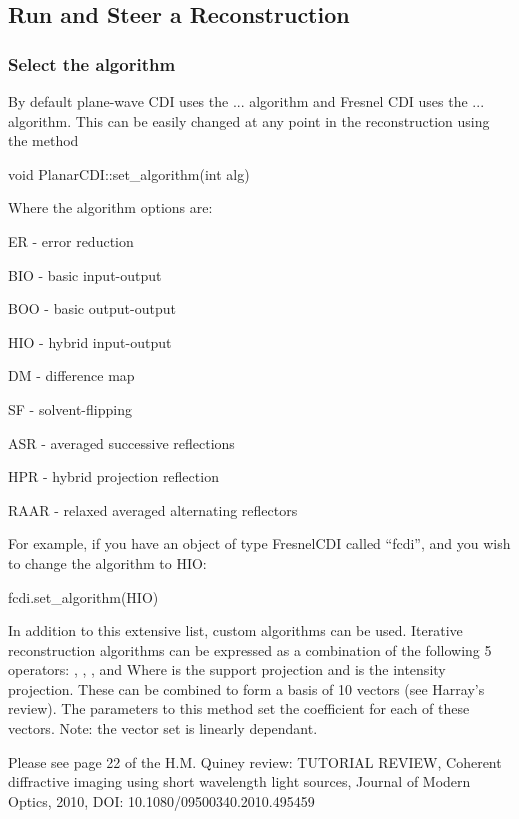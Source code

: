 \documentclass[]{cxs-software}
\begin{document}
\subsection{Run and Steer a Reconstruction}


\subsubsection{Select the algorithm}

By default plane-wave CDI uses the ... algorithm and Fresnel CDI uses
the ... algorithm. This can be easily changed at any point in the
reconstruction using the method

\begin{myverbatim}
void PlanarCDI::set_algorithm(int alg) 	
\end{myverbatim}
Where the algorithm options are:
\begin{description} 
\item ER - error reduction 
\item BIO - basic input-output 
\item BOO - basic output-output 
\item HIO - hybrid input-output 
\item DM - difference map 
\item SF - solvent-flipping 
\item ASR - averaged successive reflections 
\item HPR - hybrid projection reflection 
\item RAAR - relaxed averaged alternating reflectors
\end{description}

For example, if you have an object of type FresnelCDI called ``fcdi'', and
you wish to change the algorithm to HIO:
\begin{myverbatim}
fcdi.set_algorithm(HIO) 	
\end{myverbatim}

In addition to this extensive list, custom algorithms can be
used. Iterative reconstruction algorithms can be expressed as a
combination of the following 5 operators: , , , and Where is the
support projection and is the intensity projection. These can be
combined to form a basis of 10 vectors (see Harray's review). The
parameters to this method set the coefficient for each of these
vectors. Note: the vector set is linearly dependant.

Please see page 22 of the H.M. Quiney review: TUTORIAL REVIEW,
Coherent diffractive imaging using short wavelength light sources,
Journal of Modern Optics, 2010, DOI: 10.1080/09500340.2010.495459
\end{document}

